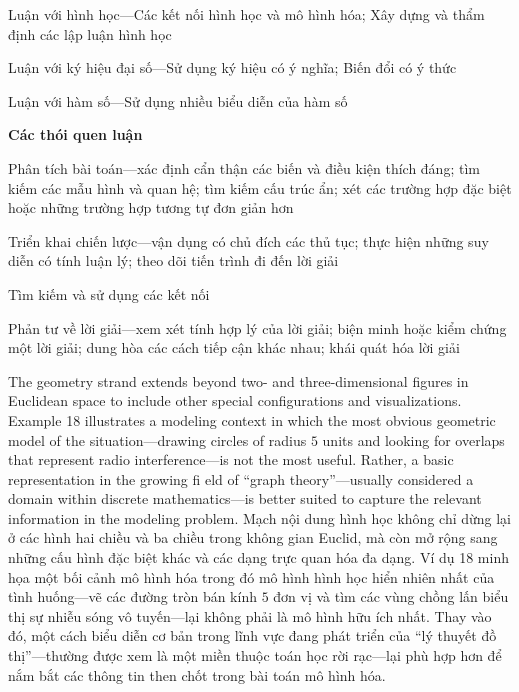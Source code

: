 \documentclass[
  10pt,
  a4paper,
  landscape,
  twoside,
  openany
]{scrbook}
\newcommand{\EN}[1]{#1}
\newcommand{\VI}[1]{#1}
\newcommand{\NOTE}[1]{#1}
\begin{document}
{Luận với hình học---Các kết nối hình học và mô hình hóa; Xây dựng và thẩm định các lập luận hình học

Luận với ký hiệu đại số---Sử dụng ký hiệu có ý nghĩa; Biến đổi có ý thức

Luận với hàm số---Sử dụng nhiều biểu diễn của hàm số

\noindent
\textbf{Các thói quen luận}

Phân tích bài toán---xác định cẩn thận các biến và điều kiện thích đáng; tìm kiếm các mẫu hình và quan hệ; tìm kiếm cấu trúc ẩn; xét các trường hợp đặc biệt hoặc những
trường hợp tương tự đơn giản hơn

Triển khai chiến lược---vận dụng có chủ đích các thủ tục; thực hiện những suy diễn có tính luận lý; theo dõi tiến trình đi đến lời giải

Tìm kiếm và sử dụng các kết nối

Phản tư về lời giải---xem xét tính hợp lý của lời giải; biện minh hoặc kiểm chứng một lời giải; dung hòa các cách tiếp cận khác nhau; khái quát hóa lời giải
}
{}

\TriPara
{
\EN{The geometry strand extends beyond two- and three-dimensional figures in Euclidean space to include other special configurations and visualizations. Example 18 illustrates a modeling context in which the most obvious geometric model of the situation---drawing circles of radius $5$ units and looking for overlaps that represent radio interference---is not the most useful. Rather, a basic representation in the growing fi eld of “graph theory”---usually considered a domain within discrete mathematics---is better suited to capture the relevant information in the modeling problem.}
}
{
\VI{Mạch nội dung hình học không chỉ dừng lại ở các hình hai chiều và ba chiều trong không gian Euclid, mà còn mở rộng sang những cấu hình đặc biệt khác và các dạng trực quan hóa đa dạng. Ví dụ 18 minh họa một bối cảnh mô hình hóa trong đó mô hình hình học hiển nhiên nhất của tình huống---vẽ các đường tròn bán kính $5$ đơn vị và tìm các vùng chồng lấn biểu thị sự nhiễu sóng vô tuyến---lại không phải là mô hình hữu ích nhất. Thay vào đó, một cách biểu diễn cơ bản trong lĩnh vực đang phát triển của ``lý thuyết đồ thị''---thường được xem là một miền thuộc toán học rời rạc---lại phù hợp hơn để nắm bắt các thông tin then chốt trong bài toán mô hình hóa.}
}
{
\NOTE{}
}
\end{document}
